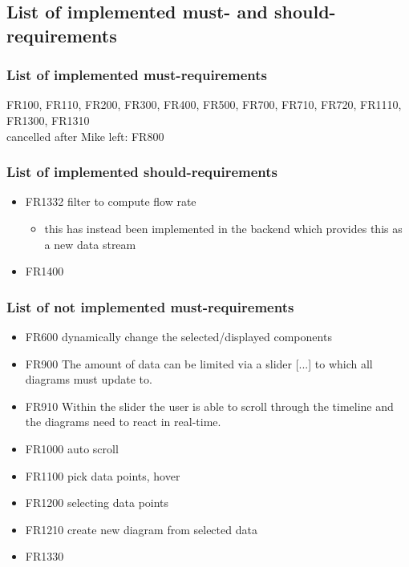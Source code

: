 \documentclass[oneside, english, final]{design}
\begin{document}
\newpage

\subsection{List of implemented must- and should-requirements}
\subsubsection{List of implemented must-requirements}
FR100, FR110, FR200, FR300, FR400, FR500, FR700, FR710, FR720, FR1110, FR1300, FR1310
\\
cancelled after Mike left: FR800

\subsubsection{List of implemented should-requirements}
\begin{itemize}
  \item{FR1332 filter to compute flow rate}
  \begin{itemize}
    \item{this has instead been implemented in the backend which provides this as a new data stream}
  \end{itemize}
  \item{FR1400}
\end{itemize}

\subsubsection{List of not implemented must-requirements}
\begin{itemize}
  \item{FR600 dynamically change the selected/displayed components}
  \item{FR900 The amount of data can be limited via a slider [...]}
to which all diagrams must update to.
  \item{FR910 Within the slider the user is able to scroll through the timeline and the diagrams need to react in real-time.}
  \item{FR1000 auto scroll}
  \item{FR1100 pick data points, hover}
  \item{FR1200 selecting data points}
  \item{FR1210 create new diagram from selected data}
  \item{FR1330}
\end{itemize}
\end{document}
